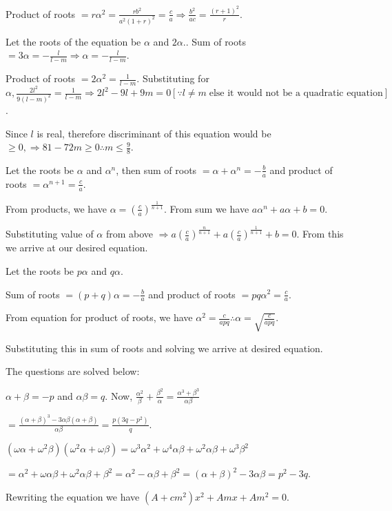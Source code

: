   Product of roots $= r\alpha^2 = \frac{rb^2}{a^2(1 + r)^2} = \frac{c}{a} \Rightarrow \frac{b^2}{ac} =
  \frac{(r + 1)^2}{r}$.
\item Let the roots of the equation be $\alpha$ and $2\alpha.$. Sum of roots $= 3\alpha = -\frac{l}{l - m}
  \Rightarrow \alpha = -\frac{l}{l - m}$.

  Product of roots $= 2\alpha^2 = \frac{1}{l - m}$. Substituting for $\alpha, \frac{2l^2}{9(l - m)^2} =
  \frac{1}{l - m} \Rightarrow 2l^2- 9l + 9m = 0 [\because l\neq m\;\text{else it would not be a quadratic
      equation}]$.

  Since $l$ is real, therefore discriminant of this equation would be $\geq 0, \Rightarrow 81 - 72m \geq 0
  \therefore m \leq \frac{9}{8}$.
\item Let the roots be $\alpha$ and $\alpha^n$, then sum of roots $= \alpha + \alpha^n = -\frac{b}{a}$ and
  product of roots $= \alpha^{n + 1} = \frac{c}{a}$.

  From products, we have $\alpha = \left(\frac{c}{a}\right)^{\frac{1}{n + 1}}$. From sum we have $a\alpha^n + a\alpha + b = 0$.

  Substituting value of $\alpha$ from above $\Rightarrow a\left(\frac{c}{a}\right)^{\frac{n}{n + 1}} +
  a\left(\frac{c}{a}\right)^{\frac{1}{n + 1}} + b = 0$.  From this we arrive at our desired equation.
\item Let the roots be $p\alpha$ and $q\alpha$.

  Sum of roots $= (p + q)\alpha = -\frac{b}{a}$ and product of roots $= pq\alpha^2 = \frac{c}{a}$.

  From equation for product of roots, we have $\alpha^2 = \frac{c}{apq} \therefore \alpha = \sqrt{\frac{c}{apq}}$.

  Substituting this in sum of roots and solving we arrive at desired equation.
\item The questions are solved below:
  \startitemize[i]
  \item $\alpha + \beta = -p$ and $\alpha\beta = q$. Now, $\frac{\alpha^2}{\beta} + \frac{\beta^2}{\alpha} =
    \frac{\alpha^3 + \beta^3}{\alpha\beta}$

    $= \frac{(\alpha + \beta)^3 - 3\alpha\beta(\alpha + \beta)}{\alpha\beta} = \frac{p(3q - p^2)}{q}$.
  \item $(\omega\alpha + \omega^2\beta)(\omega^2\alpha + \omega\beta) = \omega^3\alpha^2 +
    \omega^4\alpha\beta + \omega^2\alpha\beta + \omega^3\beta^2$

    $= \alpha^2 + \omega\alpha\beta + \omega^2\alpha\beta + \beta^2 = \alpha^2 -\alpha\beta + \beta^2 =
    (\alpha + \beta)^2 - 3\alpha\beta = p^2 - 3q$.
  \stopitemize
\item Rewriting the equation we have $(A + cm^2)x^2 + Amx + Am^2 = 0$.


